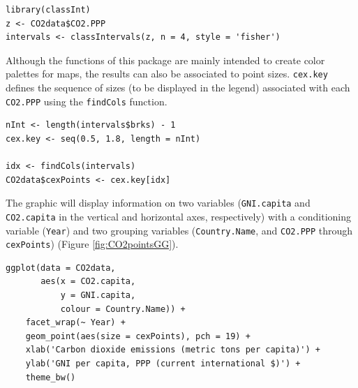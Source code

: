 \lstset{language=r,label= ,caption= ,captionpos=b,numbers=none}
\begin{lstlisting}
library(classInt)
z <- CO2data$CO2.PPP
intervals <- classIntervals(z, n = 4, style = 'fisher')
\end{lstlisting}

Although the functions of this package are mainly intended to create color palettes for maps, the results can also be associated to point sizes. \texttt{cex.key} defines the sequence of sizes (to be displayed in the legend) associated with each \texttt{CO2.PPP} using the \texttt{findCols} function.
\lstset{language=r,label= ,caption= ,captionpos=b,numbers=none}
\begin{lstlisting}
nInt <- length(intervals$brks) - 1
cex.key <- seq(0.5, 1.8, length = nInt)

idx <- findCols(intervals)
CO2data$cexPoints <- cex.key[idx]
\end{lstlisting}

The graphic will display information on two variables (\texttt{GNI.capita} and \texttt{CO2.capita} in the vertical and horizontal axes, respectively) with a conditioning variable (\texttt{Year}) and two grouping variables (\texttt{Country.Name}, and \texttt{CO2.PPP} through \texttt{cexPoints}) (Figure \ref{fig:CO2pointsGG}).

\lstset{language=r,label= ,caption= ,captionpos=b,numbers=none}
\begin{lstlisting}
ggplot(data = CO2data,
       aes(x = CO2.capita,
           y = GNI.capita,
           colour = Country.Name)) +
    facet_wrap(~ Year) +
    geom_point(aes(size = cexPoints), pch = 19) +
    xlab('Carbon dioxide emissions (metric tons per capita)') +
    ylab('GNI per capita, PPP (current international $)') +
    theme_bw()
\end{lstlisting}

